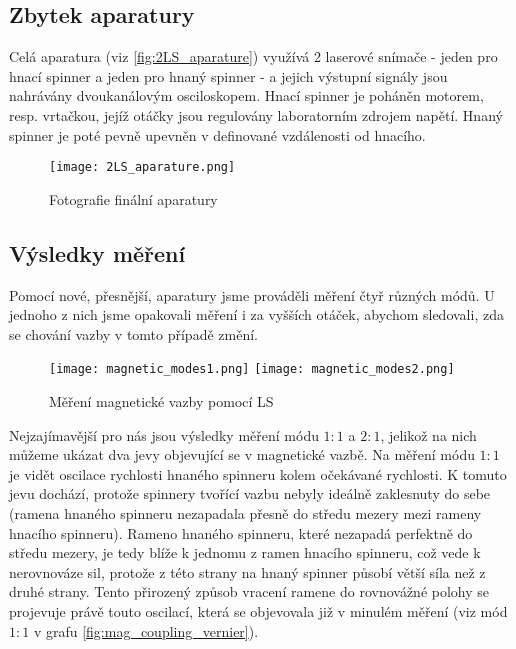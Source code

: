 \subsection{Zbytek aparatury}
\label{sub:main_2LS_aparature}

Celá aparatura (viz \autoref{fig:2LS_aparature}) využívá 2 laserové snímače - jeden pro hnací spinner a jeden pro hnaný spinner - a jejich výstupní signály jsou nahrávány dvoukanálovým osciloskopem. Hnací spinner je poháněn motorem, resp. vrtačkou, jejíž otáčky jsou regulovány laboratorním zdrojem napětí. Hnaný spinner je poté pevně upevněn v definované vzdálenosti od hnacího.

\clearpage
\begin{figure}[H]
    \texttt{[image: 2LS\_aparature.png]}
    \centering
    \caption{Fotografie finální aparatury}
    \label{fig:2LS_aparature}
\end{figure}
\subsection{Výsledky měření}
{
    \raggedright
    Pomocí nové, přesnější, aparatury jsme prováděli měření čtyř různých módů. U jednoho z nich jsme opakovali měření i za vyšších otáček, abychom sledovali, zda se chování vazby v tomto případě změní.
}
\begin{figure}[H]
    \texttt{[image: magnetic\_modes1.png]}
    \texttt{[image: magnetic\_modes2.png]}
    \centering
    \caption{Měření magnetické vazby pomocí LS}
    \label{fig:ang_sub_periods}
\end{figure}

Nejzajímavější pro nás jsou výsledky měření módu $1:1$ a $2:1$, jelikož na nich můžeme ukázat dva jevy objevující se v magnetické vazbě. Na měření módu $1:1$ je vidět oscilace rychlosti hnaného spinneru kolem očekávané rychlosti. K tomuto jevu dochází, protože spinnery tvořící vazbu nebyly ideálně zaklesnuty do sebe (ramena hnaného spinneru nezapadala přesně do středu mezery mezi rameny hnacího spinneru). Rameno hnaného spinneru, které nezapadá perfektně do středu mezery, je tedy blíže k jednomu z ramen hnacího spinneru, což vede k nerovnováze sil, protože z této strany na hnaný spinner působí větší síla než z druhé strany. Tento přirozený způsob vracení ramene do rovnovážné polohy se projevuje právě touto oscilací, která se objevovala již v minulém měření (viz mód $1:1$ v grafu \ref{fig:mag_coupling_vernier}).

